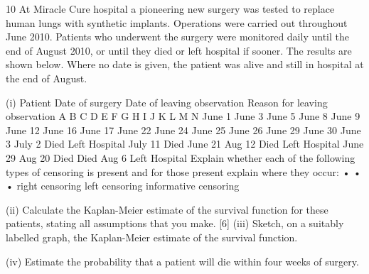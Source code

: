 \documentclass[a4paper,12pt]{article}
\begin{document}
10
At Miracle Cure hospital a pioneering new surgery was tested to replace human lungs with synthetic implants. Operations were carried out throughout June 2010. Patients
who underwent the surgery were monitored daily until the end of August 2010, or until they died or left hospital if sooner. The results are shown below. Where no date
is given, the patient was alive and still in hospital at the end of August.

(i)
Patient Date of surgery Date of leaving
observation Reason for
leaving
observation
A
B
C
D
E
F
G
H
I
J
K
L
M
N June 1
June 3
June 5
June 8
June 9
June 12
June 16
June 17
June 22
June 24
June 25
June 26
June 29
June 30 June 3
July 2 Died
Left Hospital
July 11 Died
June 21
Aug 12 Died
Left Hospital
June 29
Aug 20 Died
Died
Aug 6 Left Hospital
Explain whether each of the following types of censoring is present and for
those present explain where they occur:
•
•
•
right censoring
left censoring
informative censoring

(ii)
Calculate the Kaplan-Meier estimate of the survival function for these
patients, stating all assumptions that you make.
[6]
(iii) Sketch, on a suitably labelled graph, the Kaplan-Meier estimate of the survival
function.

(iv) Estimate the probability that a patient will die within four weeks of surgery.
\end{document}
